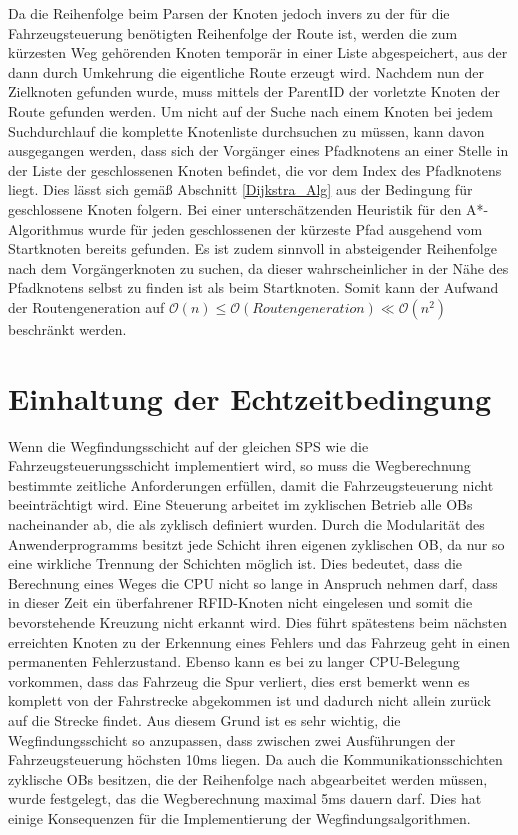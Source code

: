 			Da die Reihenfolge beim Parsen der Knoten jedoch invers zu der für die Fahrzeugsteuerung benötigten Reihenfolge der Route ist, werden die zum kürzesten Weg gehörenden Knoten temporär in einer Liste abgespeichert, aus der dann durch Umkehrung die eigentliche Route erzeugt wird. Nachdem nun der Zielknoten gefunden wurde, muss mittels der ParentID der vorletzte Knoten der Route gefunden werden. Um nicht auf der Suche nach einem Knoten bei jedem Suchdurchlauf die komplette Knotenliste durchsuchen zu müssen, kann davon ausgegangen werden, dass sich der Vorgänger eines Pfadknotens an einer Stelle in der Liste der geschlossenen Knoten befindet, die vor dem  Index des Pfadknotens liegt. Dies lässt sich gemäß Abschnitt \ref{Dijkstra_Alg} aus der Bedingung für geschlossene Knoten folgern. Bei einer unterschätzenden Heuristik für den A*-Algorithmus wurde für jeden geschlossenen der kürzeste Pfad ausgehend vom Startknoten bereits gefunden. Es ist zudem sinnvoll in absteigender Reihenfolge nach dem Vorgängerknoten zu suchen, da dieser wahrscheinlicher in der Nähe des Pfadknotens selbst zu finden ist als beim Startknoten. Somit kann der Aufwand der Routengeneration auf $\mathcal{O}(n)\le \mathcal{O}(Routengeneration)\ll \mathcal{O}(n^2)$ beschränkt werden.
			
			
	\section{Einhaltung der Echtzeitbedingung}
		\label{Echtzeitbedingung}
		Wenn die Wegfindungsschicht auf der gleichen \ac{SPS} wie die Fahrzeugsteuerungsschicht implementiert wird, so muss die Wegberechnung bestimmte zeitliche Anforderungen erfüllen, damit die Fahrzeugsteuerung nicht beeinträchtigt wird. Eine Steuerung arbeitet im zyklischen Betrieb alle \ac{OB}s nacheinander ab, die als zyklisch definiert wurden. Durch die Modularität des Anwenderprogramms besitzt jede Schicht ihren eigenen zyklischen \ac{OB}, da nur so eine wirkliche Trennung der Schichten möglich ist. Dies bedeutet, dass die Berechnung eines Weges die CPU nicht so lange in Anspruch nehmen darf, dass in dieser Zeit  ein überfahrener RFID-Knoten nicht eingelesen und somit die bevorstehende Kreuzung nicht erkannt wird. Dies führt spätestens beim nächsten erreichten Knoten zu der Erkennung eines Fehlers und das Fahrzeug geht in einen permanenten Fehlerzustand. Ebenso kann es bei zu langer CPU-Belegung vorkommen, dass das Fahrzeug die Spur verliert, dies erst bemerkt wenn es komplett von der Fahrstrecke abgekommen ist und dadurch nicht allein zurück auf die Strecke findet. Aus diesem Grund ist es sehr wichtig, die Wegfindungsschicht so anzupassen, dass zwischen zwei Ausführungen der Fahrzeugsteuerung höchsten 10ms liegen. Da auch die Kommunikationsschichten zyklische \ac{OB}s besitzen, die der Reihenfolge nach abgearbeitet werden müssen, wurde festgelegt, das die Wegberechnung maximal 5ms dauern darf. Dies hat einige Konsequenzen für die Implementierung der Wegfindungsalgorithmen.
		
